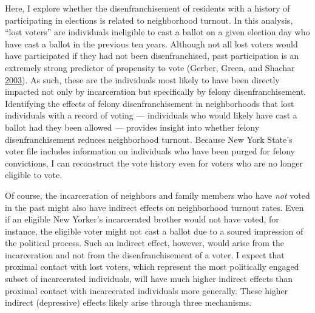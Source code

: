 \documentclass[12pt,]{article}
\begin{document}
Here, I explore whether the disenfranchisement of residents with a history of participating in elections is related to neighborhood turnout. In this analysis, ``lost voters'' are individuals ineligible to cast a ballot on a given election day who have cast a ballot in the previous ten years. Although not all lost voters would have participated if they had not been disenfranchised, past participation is an extremely strong predictor of propensity to vote (Gerber, Green, and Shachar \protect\hyperlink{ref-Gerber2003}{2003}). As such, these are the individuals most likely to have been directly impacted not only by incarceration but specifically by felony disenfranchisement. Identifying the effects of felony disenfranchisement in neighborhoods that lost individuals with a record of voting --- individuals who would likely have cast a ballot had they been allowed --- provides insight into whether felony disenfranchisement reduces neighborhood turnout. Because New York State's voter file includes information on individuals who have been purged for felony convictions, I can reconstruct the vote history even for voters who are no longer eligible to vote.

Of course, the incarceration of neighbors and family members who have \emph{not} voted in the past might also have indirect effects on neighborhood turnout rates. Even if an eligible New Yorker's incarcerated brother would not have voted, for instance, the eligible voter might not cast a ballot due to a soured impression of the political process. Such an indirect effect, however, would arise from the incarceration and not from the disenfranchisement of a voter. I expect that proximal contact with lost voters, which represent the most politically engaged subset of incarcerated individuals, will have much higher indirect effects than proximal contact with incarcerated individuals more generally. These higher indirect (depressive) effects likely arise through three mechanisms.
\end{document}
